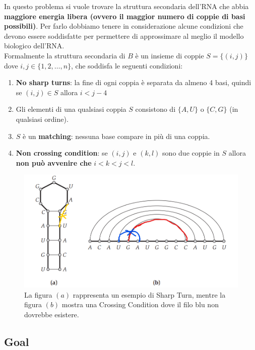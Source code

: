 In questo problema si vuole trovare la struttura secondaria dell'RNA che
abbia \textbf{maggiore energia libera (ovvero il maggior numero di
  coppie di basi possibili)}. Per farlo dobbiamo tenere in considerazione
alcune condizioni che devono essere soddisfatte per permettere di
approssimare al meglio il modello biologico dell'RNA.\\

Formalmente la struttura secondaria di $B$ è un insieme di coppie
$S = \{(i,j)\}$ dove $i,j \in \{1,2,\ldots,n\}$, che soddisfa le
seguenti condizioni:

\begin{enumerate}
  \def\labelenumi{\arabic{enumi}.}
  \item
        \textbf{No sharp turns}: la fine di ogni coppia è separata da almeno 4
        basi, quindi se $(i,j) \in S$ allora $i < j - 4$
  \item
        Gli elementi di una qualsiasi coppia $S$ consistono di $\{A, U\}$
        o $\{C, G\}$ (in qualsiasi ordine).
  \item
        $S$ è un \textbf{matching}: nessuna base compare in più di una
        coppia.
  \item
        \textbf{Non crossing condition}: se $(i, j)$ e $(k,l)$ sono due
        coppie in $S$ allora \textbf{non può avvenire che}
        $i < k < j < l$.
\end{enumerate}

\begin{figure}[H]
  \includegraphics[width=15cm, keepaspectratio]{capitoli/programmazione_dinamica/imgs/rna2.png}
  \centering
  \caption{La figura $(a)$ rappresenta un esempio di Sharp Turn, mentre la
    figura $(b)$ mostra una Crossing Condition dove il filo blu non dovrebbe
    esistere.}
\end{figure}

\subsection{Goal}

